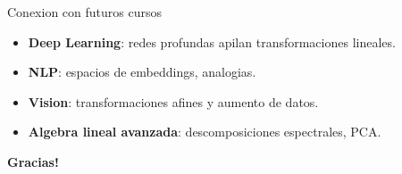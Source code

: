 \documentclass[aspectratio=169, 10pt, xcolor=table]{beamer}
\begin{document}
\begin{frame}{Conexion con futuros cursos}
    \begin{itemize}
        \item \textbf{Deep Learning}: redes profundas apilan transformaciones lineales.
        \item \textbf{NLP}: espacios de embeddings, analogias.
        \item \textbf{Vision}: transformaciones afines y aumento de datos.
        \item \textbf{Algebra lineal avanzada}: descomposiciones espectrales, PCA.
    \end{itemize}
\end{frame}

\begin{frame}
    \centering
    \Huge \textbf{Gracias!}

\end{frame}
\end{document}

